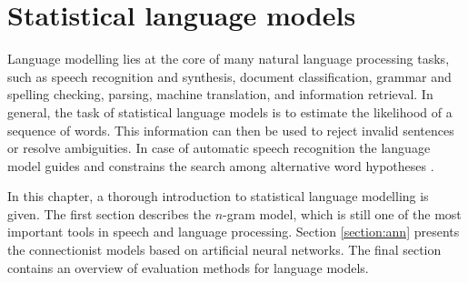 \chapter{Statistical language models}
\label{chapter:lm}
Language modelling lies at the core of many natural language processing tasks, such as speech recognition and synthesis, document classification, grammar and spelling checking, parsing, machine translation, and information retrieval. In general, the task of statistical language models is to estimate the likelihood of a sequence of words. This information can then be used to reject invalid sentences or resolve ambiguities. In case of automatic speech recognition the language model guides and constrains the search among alternative word hypotheses \cite{glass2013automatic}.

In this chapter, a thorough introduction to statistical language modelling is given. The first section describes the $n$-gram model, which is still one of the most important tools in speech and language processing. Section \ref{section:ann} presents the connectionist models based on artificial neural networks. The final section contains an overview of evaluation methods for language models.
